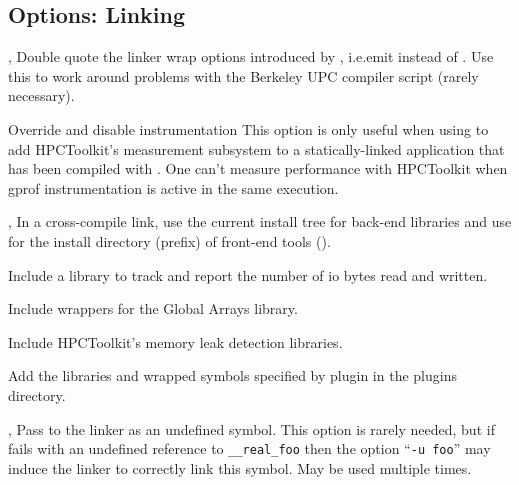 \documentclass[english]{article}
\begin{document}
\subsection{Options: Linking}

\begin{Description}

\item[\Opt{-dw}, \Opt{--double-wrap}]
Double quote the linker wrap options introduced by ,
i.e.emit  instead of .
Use this to work around problems with the Berkeley UPC compiler script (rarely necessary).

\item[\Opt{--disable-gprof}]
Override and disable  instrumentation  This option
is only useful when using  to add HPCToolkit's
measurement subsystem to a statically-linked application
that has been compiled with . One can't measure
performance with HPCToolkit when gprof instrumentation
is active in the same execution.

\item[\OptArg{-fe}{dir}, \OptArg{--front-end}{dir}]
In a cross-compile link,
use the current install tree for back-end libraries and
use  for the install directory (prefix) of front-end tools ().

\item[\Opt{--io}]
Include a library to track and report the number of io bytes read and written.

\item[\Opt{--ga}]
Include wrappers for the Global Arrays library.

\item[\Opt{--memleak}]
Include HPCToolkit's memory leak detection libraries.

\item[\OptArg{--plugin}{name}]
Add the libraries and wrapped symbols specified by plugin  in the plugins directory.

\item[\OptArg{-u}{symbol}, \OptArg{--undefined}{symbol}]
Pass  to the linker as an undefined symbol.
This option is rarely needed,
but if  fails with an undefined reference to \texttt{\_\_real\_foo}
then the option ``\texttt{-u foo}'' may induce the linker to correctly link this symbol.
May be used multiple times.

\end{Description}
\end{document}
